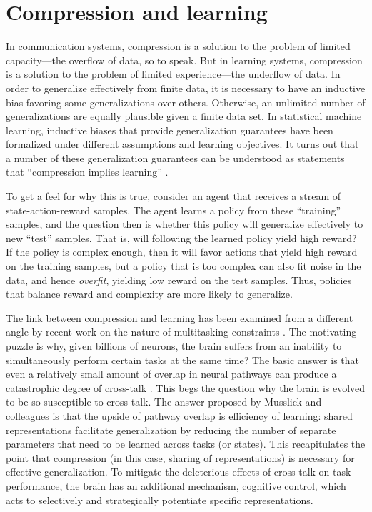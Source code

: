 \documentclass[11pt]{article}
\begin{document}
\section{Compression and learning}

In communication systems, compression is a solution to the problem of limited capacity---the overflow of data, so to speak. But in learning systems, compression is a solution to the problem of limited experience---the underflow of data. In order to generalize effectively from finite data, it is necessary to have an inductive bias favoring some generalizations over others. Otherwise, an unlimited number of generalizations are equally plausible given a finite data set. In statistical machine learning, inductive biases that provide generalization guarantees have been formalized under different assumptions and learning objectives. It turns out that a number of these generalization guarantees can be understood as statements that ``compression implies learning'' \citep{blum03,blumer87}.

To get a feel for why this is true, consider an agent that receives a stream of state-action-reward samples. The agent learns a policy from these ``training'' samples, and the question then is whether this policy will generalize effectively to new ``test'' samples. That is, will following the learned policy yield high reward? If the policy is complex enough, then it will favor actions that yield high reward on the training samples, but a policy that is too complex can also fit noise in the data, and hence \emph{overfit}, yielding low reward on the test samples. Thus, policies that balance reward and complexity are more likely to generalize.

The link between compression and learning has been examined from a different angle by recent work on the nature of multitasking constraints \citep{musslick17,musslick20,sagiv18}. The motivating puzzle is why, given billions of neurons, the brain suffers from an inability to simultaneously perform certain tasks at the same time? The basic answer is that even a relatively small amount of overlap in neural pathways can produce a catastrophic degree of cross-talk \citep{feng14}. This begs the question why the brain is evolved to be so susceptible to cross-talk. The answer proposed by Musslick and colleagues is that the upside of pathway overlap is efficiency of learning: shared representations facilitate generalization by reducing the number of separate parameters that need to be learned across tasks (or states). This recapitulates the point that compression (in this case, sharing of representations) is necessary for effective generalization. To mitigate the deleterious effects of cross-talk on task performance, the brain has an additional mechanism, cognitive control, which acts to selectively and strategically potentiate specific representations.
\end{document}
